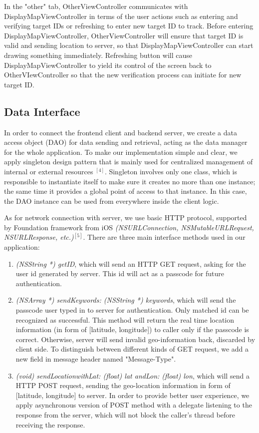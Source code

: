 \documentclass[journal]{IEEEtran}
\begin{document}
In the "other" tab, OtherViewController communicates with DisplayMapViewController in terms of the user actions such as entering and verifying target IDs or refreshing to enter new target ID to track. Before entering DisplayMapViewController, OtherViewController will ensure that target ID is valid and sending location to server,  so that DisplayMapViewController can start drawing something immediately. Refreshing button will cause DisplayMapViewController to yield its control of the screen back to OtherVIewController so that the new verification process can initiate for new target ID.

\subsection{Data Interface}
In order to connect the frontend client and backend server, we create a data access object (DAO) for data sending and retrieval, acting as the data manager for the whole application. To make our implementation simple and clear, we apply singleton design pattern that is mainly used for centralized management of internal or external resources $^{[4]}$. Singleton involves only one class, which is responsible to instantiate itself to make sure it creates no more than one instance; the same time it provides a global point of access to that instance. In this case, the DAO instance can be used from everywhere inside the client logic.
 
As for network connection with server, we use basic HTTP protocol, supported by Foundation framework from iOS \textit{(NSURLConnection, NSMutableURLRequest, NSURLResponse, etc.)}$^{[5]}$. There are three main interface methods used in our application:
 
 \begin{enumerate}
 \item
\textit{(NSString *) getID}, which will send an HTTP GET request, asking for the user id generated by server. This id will act as a passcode for future authentication.
\item
\textit{(NSArray *) sendKeywords: (NSString *) keywords}, which will send the passcode user typed in to server for authentication. Only matched id can be recognized as successful. This method will return the real time location information (in form of [latitude, longitude]) to caller only if the passcode is correct. Otherwise, server will send invalid geo-information back, discarded by client side. To distinguish between different kinds of GET request, we add a new field in message header named "Message-Type".
\item
\textit{(void) sendLocationwithLat: (float) lat andLon: (float) lon}, which will send a HTTP POST request, sending the geo-location information in form of [latitude, longitude] to server. In order to provide better user experience, we apply asynchronous version of POST method with a delegate listening to the response from the server, which will not block the caller's thread before receiving the response.
 \end{enumerate}
 
\end{document}
